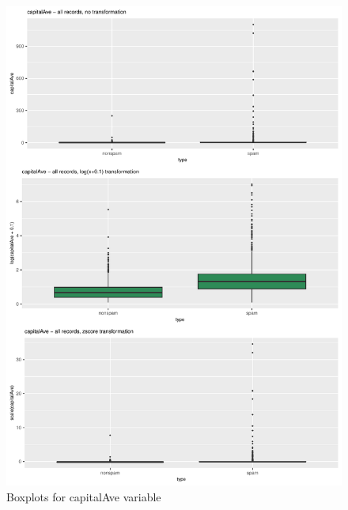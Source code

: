 \documentclass{article}\usepackage[]{graphicx}\usepackage[]{xcolor}
\makeatletter
\def\maxwidth{ %
  \ifdim\Gin@nat@width>\linewidth
    \linewidth
  \else
    \Gin@nat@width
  \fi
}
\newenvironment{knitrout}{}{} %
\makeatother
\begin{document}
\begin{knitrout}
\color{fgcolor}\begin{figure}[h]
\includegraphics[width=\maxwidth]{figure/capitalAveBox-1} \caption[\label{fig5} Boxplots for capitalAve variable]{\label{fig5} Boxplots for capitalAve variable}\label{fig:capitalAveBox}
\end{figure}

\end{knitrout}
\end{document}
